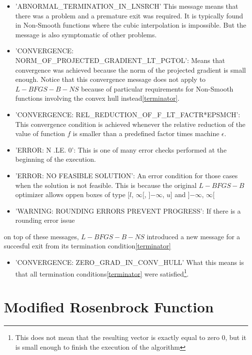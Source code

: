 \begin{itemize}

\item 'ABNORMAL\_TERMINATION\_IN\_LNSRCH' This message means that there was a problem and a premature exit was required. It is typically found in Non-Smooth functions where the cubic interpolation is impossible. But the message is also symptomatic of other problems.

\item 'CONVERGENCE: NORM\_OF\_PROJECTED\_GRADIENT\_LT\_PGTOL': Means that convergence was achieved because the norm of the projected gradient is small enough. Notice that this convergence message does not apply to $L-BFGS-B-NS$ because of particular requirements for Non-Smooth functions involving the convex hull instead\ref{terminator}.
\item 'CONVERGENCE: REL\_REDUCTION\_OF\_F\_LT\_FACTR*EPSMCH': This convergence condition is achieved whenever the relative reduction of the value of function $f$ is smaller than a predefined factor times machine $\epsilon$.

\item 'ERROR: N .LE. 0': This is one of many error checks performed at the beginning of the execution.

\item 'ERROR: NO FEASIBLE SOLUTION': An error condition for those cases when the solution is not feasible. This is because the original $L-BFGS-B$ optimizer allows oppen boxes of type [$l$, $\infty$[, ]$-\infty$, $u$] and ]$-\infty$, $\infty$[

\item 'WARNING: ROUNDING ERRORS PREVENT PROGRESS': If there is a rounding error issue

\end{itemize}

on top of these messages, $L-BFGS-B-NS$ introduced a new message for a succesful exit from its termination condition\ref{terminator}

\begin{itemize}
\item 'CONVERGENCE: ZERO\_GRAD\_IN\_CONV\_HULL' What this means is that all termination conditions\ref{terminator} were satisfied\footnote{This does not mean that the resulting vector is exactly equal to zero $0$, but it is small enough to finish the execution of the algorithm}.
\end{itemize}

\section{Modified Rosenbrock Function} \label{ros}

